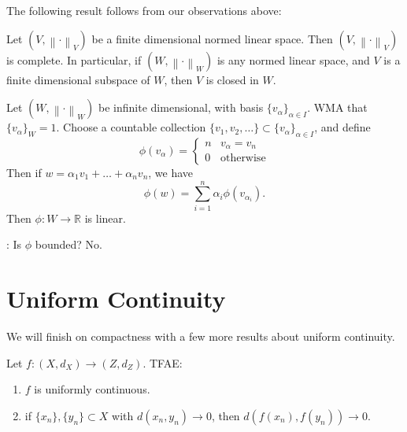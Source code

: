 \documentclass[notoc,notitlepage]{tufte-book}
\newcommand{\norm}[1]{\left\| #1 \right\|}
\begin{document}
The following result follows from our observations above:

\begin{thm}\label{thm:completeness_of_finite_dimensional_normed_linear_spaces}
  Let $(V, \norm\cdot_V)$ be a finite dimensional normed linear space. Then $(V, \norm\cdot_V)$ is complete. In particular, if $(W, \norm\cdot_W)$ is any normed linear space, and $V$ is a finite dimensional subspace of $W$, then $V$ is closed in $W$.
\end{thm}

\begin{eg}
  Let $(W, \norm\cdot_W)$ be infinite dimensional, with basis $\{ v_\alpha \}_{\alpha \in I}$. WMA that $\{ v_\alpha \}_W = 1$. Choose a countable collection $\{ v_1, v_2, \ldots \} \subset \{ v_\alpha \}_{\alpha \in I}$, and define
  \begin{equation*}
    \phi(v_\alpha) = \begin{cases}
      n & v_\alpha = v_n \\
      0 & \text{otherwise}
    \end{cases}
  \end{equation*}
  Then if $w = \alpha_1 v_1 + \hdots + \alpha_n v_n$, we have
  \begin{equation*}
    \phi(w) = \sum_{i=1}^{n} \alpha_i \phi(v_{\alpha_i}).
  \end{equation*}
  Then $\phi : W \to \mathbb{R}$ is linear.
\end{eg}

: Is $\phi$ bounded? No.


\section{Uniform Continuity}%
\label{sec:uniform_continuity}

We will finish on compactness with a few more results about uniform continuity.

\begin{thm}\label{thm:sequential_characterization_of_uniform_continuity}
  Let $f : (X, d_X) \to (Z, d_Z)$. TFAE:
  \begin{enumerate}
    \item $f$ is uniformly continuous.
    \item if $\{ x_n \}, \{ y_n \} \subset X$ with $d(x_n, y_n) \to 0$, then $d(f(x_n), f(y_n)) \to 0$.
  \end{enumerate}
\end{thm}
\end{document}
